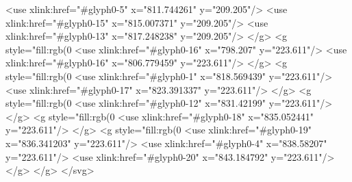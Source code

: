   <use xlink:href="#glyph0-5" x="811.744261" y="209.205"/>
  <use xlink:href="#glyph0-15" x="815.007371" y="209.205"/>
  <use xlink:href="#glyph0-13" x="817.248238" y="209.205"/>
</g>
<g style="fill:rgb(0%
  <use xlink:href="#glyph0-16" x="798.207" y="223.611"/>
  <use xlink:href="#glyph0-16" x="806.779459" y="223.611"/>
</g>
<g style="fill:rgb(0%
  <use xlink:href="#glyph0-1" x="818.569439" y="223.611"/>
  <use xlink:href="#glyph0-17" x="823.391337" y="223.611"/>
</g>
<g style="fill:rgb(0%
  <use xlink:href="#glyph0-12" x="831.42199" y="223.611"/>
</g>
<g style="fill:rgb(0%
  <use xlink:href="#glyph0-18" x="835.052441" y="223.611"/>
</g>
<g style="fill:rgb(0%
  <use xlink:href="#glyph0-19" x="836.341203" y="223.611"/>
  <use xlink:href="#glyph0-4" x="838.58207" y="223.611"/>
  <use xlink:href="#glyph0-20" x="843.184792" y="223.611"/>
</g>
</g>
</svg>
